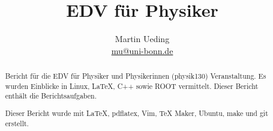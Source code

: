 \documentclass[12pt]{article}
\title{EDV für Physiker}
\author{Martin Ueding \\ \href{mailto:mu@uni-bonn.de}{mu@uni-bonn.de}}
\newcommand\gqq[1]{\glqq #1\grqq}
\begin{document}
\maketitle

\begin{abstract}
Bericht für die \gqq{EDV für Physiker und Physikerinnen} (physik130) Veranstaltung. Es wurden Einblicke in Linux, \LaTeX, C++ sowie ROOT vermittelt. Dieser Bericht enthält die Berichtsaufgaben.

Dieser Bericht wurde mit \LaTeX, pdflatex, Vim, TeX Maker, Ubuntu, make und git erstellt.
\end{abstract}

\newpage

\tableofcontents
\newpage






\end{document}
